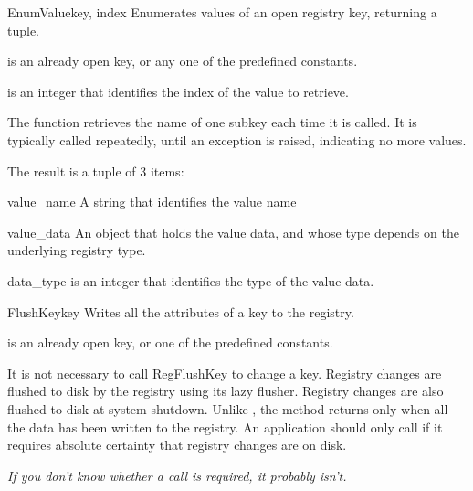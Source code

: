 \begin{funcdesc}{EnumValue}{key, index}
  Enumerates values of an open registry key, returning a tuple.
  
  is an already open key, or any one of the predefined 
  constants.
 
  is an integer that identifies the index of the value 
 to retrieve.
 
 The function retrieves the name of one subkey each time it is 
 called. It is typically called repeatedly, until an 
  exception is raised, indicating 
 no more values.
 
 The result is a tuple of 3 items:
 \item[value_name]
 A string that identifies the value name
 \item[value_data]
 An object that holds the value data, and whose type depends
 on the underlying registry type.
 \item[data_type] is an integer that identifies the type of the 
 value data.

\end{funcdesc}


\begin{funcdesc}{FlushKey}{key}
  Writes all the attributes of a key to the registry.

  is an already open key, or one of the predefined 
  constants.

 It is not necessary to call RegFlushKey to change a key.
 Registry changes are flushed to disk by the registry using its lazy 
 flusher.  Registry changes are also flushed to disk at system 
 shutdown.  Unlike , the  method 
 returns only when all the data has been written to the registry.
 An application should only call  if it requires absolute 
 certainty that registry changes are on disk.
 
 \emph{If you don't know whether a  call is required, it 
 probably isn't.}
 
\end{funcdesc}


